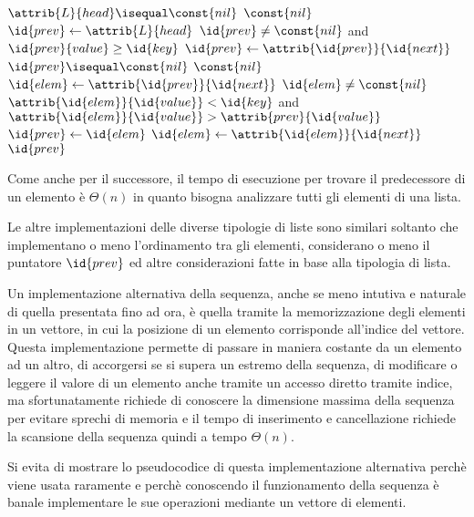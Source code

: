 \begin{codebox}
\li \If $\attrib{L}{head} \isequal \const{nil}$
    \Then
\li                \Return $\const{nil}$
\li $\id{prev} \gets \attrib{L}{head}$
\li \While $\id{prev} \neq \const{nil}$ and $\id{prev}{value} \geq \id{key}$
    \Do
\li           $\id{prev} \gets \attrib{\id{prev}}{\id{next}}$
    \End
\li \If $\id{prev} \isequal \const{nil}$ \Return $\const{nil}$
\li $\id{elem} \gets \attrib{\id{prev}}{\id{next}}$
\li \While $\id{elem} \neq \const{nil}$
    \Do
\li      \If $\attrib{\id{elem}}{\id{value}} < \id{key}$ and $\attrib{\id{elem}}{\id{value}} > \attrib{prev}{\id{value}}$
         \Then
\li                              $\id{prev} \gets \id{elem}$
         \End
\li      $\id{elem} \gets \attrib{\id{elem}}{\id{next}}$
    \End
\li \Return $\id{prev}$
\end{codebox}
Come anche per il successore, il tempo di esecuzione per trovare il predecessore di
un elemento è $\Theta(n)$ in quanto bisogna analizzare tutti gli elementi di una lista.

Le altre implementazioni delle diverse tipologie di liste sono similari soltanto che implementano o meno l'ordinamento tra gli elementi,
considerano o meno il puntatore $\id{prev}$ ed altre considerazioni fatte in base alla tipologia di lista.

Un implementazione alternativa della sequenza, anche se meno intutiva e naturale di quella presentata fino ad ora,
è quella tramite la memorizzazione degli elementi in un vettore, in cui la posizione di un elemento corrisponde all'indice del vettore.\newline
Questa implementazione permette di passare in maniera costante da un elemento ad un altro, di accorgersi se si supera un estremo della sequenza,
di modificare o leggere il valore di un elemento anche tramite un accesso diretto tramite indice, ma sfortunatamente richiede di conoscere 
la dimensione massima della sequenza per evitare sprechi di memoria e il tempo di inserimento e cancellazione richiede la scansione della sequenza quindi a tempo $\Theta(n)$.

Si evita di mostrare lo pseudocodice di questa implementazione alternativa perchè viene usata raramente e perchè conoscendo il funzionamento della sequenza è banale
implementare le sue operazioni mediante un vettore di elementi.
